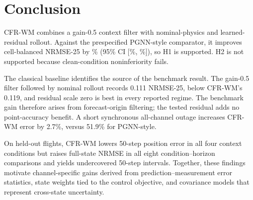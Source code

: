 \section{Conclusion}

CFR-WM combines a gain-0.5 context filter with nominal-physics and learned-
residual rollout. Against the prespecified PGNN-style comparator, it improves
cell-balanced NRMSE-25 by \PrimaryImprovement\% (95\% CI
[\PrimaryRelativeCILow\%, \PrimaryRelativeCIHigh\%]), so H1 is supported. H2
is not supported because clean-condition noninferiority fails.

The classical baseline identifies the source of the benchmark result.
The gain-0.5 filter followed by nominal rollout records 0.111 NRMSE-25, below
CFR-WM's 0.119, and residual scale zero is best in every reported regime.
The benchmark gain therefore arises from forecast-origin filtering; the tested
residual adds no point-accuracy benefit.
A short synchronous all-channel outage increases CFR-WM error by 2.7\%, versus
51.9\% for PGNN-style.

On held-out flights, CFR-WM lowers 50-step position error in all four context
conditions but raises full-state NRMSE in all eight condition--horizon
comparisons and yields undercovered 50-step intervals. Together, these findings
motivate channel-specific gains derived from prediction--measurement error
statistics, state weights tied to the control objective, and covariance models
that represent cross-state uncertainty.

